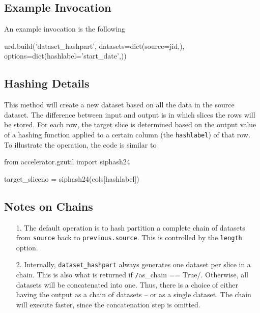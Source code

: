 \subsection{Example Invocation}
An example invocation is the following
\begin{python}
urd.build('dataset_hashpart',
          datasets=dict(source=jid,), 
          options=dict(hashlabel='start_date',))
\end{python}


\subsection{Hashing Details}
This method will create a new dataset based on all the data in the
source dataset.  The difference between input and output is in which
slices the rows will be stored.  For each row, the target slice is
determined based on the output value of a hashing function applied to
a certain column (the \texttt{hashlabel}) of that row.  To illustrate
the operation, the code is similar to
\begin{python}
from accelerator.gzutil import siphash24

target_sliceno = siphash24(cols[hashlabel]) %
\end{python}


\subsection{Notes on Chains}
\begin{enumerate}
  \item[1.]  The default operation is to hash partition a complete
    chain of datasets from \texttt{source} back to
    \texttt{previous.source}.  This is controlled by the
    \texttt{length} option.

  \item[2.]  Internally, \texttt{dataset\_hashpart} always
    generates one dataset per slice in a chain.  This is also what is
    returned if \texttt/as_chain == True/.  Otherwise, all
    datasets will be concatenated into one.  Thus, there is a choice
    of either having the output as a chain of datasets -- or as a
    single dataset.  The chain will execute faster, since the
    concatenation step is omitted.
\end{enumerate}


